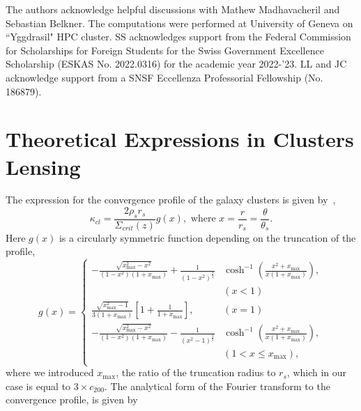 \documentclass[prd, superscriptaddress, tightenlines, longbibliography, nofootinbib, eqsecnum, amsfonts, amsmath, floatfix, twocolumn, notitlepage]{revtex4-2}
\begin{document}
\begin{acknowledgements}
The authors acknowledge helpful discussions with Mathew Madhavacheril and Sebastian Belkner. The computations were performed at University of Geneva on ``Yggdrasil" HPC cluster. SS acknowledges support from the Federal Commission for Scholarships for Foreign Students for the Swiss Government Excellence Scholarship (ESKAS No. 2022.0316) for the academic year 2022-'23. LL and JC acknowledge support from a SNSF Eccellenza Professorial Fellowship (No. 186879).

\end{acknowledgements}

\appendix
\section{Theoretical Expressions in Clusters Lensing}\label{A2}
The expression for the convergence profile of the galaxy clusters is given by~\cite{Takada:2002qq},
\begin{equation}
    \kappa_{cl} = \frac{2\rho_s r_s}{\Sigma_{crit}(z)}g(x), \text{ where } x=\frac{r}{r_s} = \frac{\theta}{\theta_s}.
\end{equation}
Here $g(x)$ is a circularly symmetric function depending on the truncation of the profile,
\begin{equation}
    g(x) = 
     \begin{cases}
       -\frac{\sqrt{x_{\text{max}}^2-x^2}}{(1-x^2)(1+x_{\text{max}})} + \frac{1}{(1-x^2)^{\frac{3}{2}}}&\cosh^{-1}\left(\frac{x^2+x_{\text{max}}}{x(1+x_{\text{max}})}\right),  \\ &(x < 1)\\
       \frac{\sqrt{x_{\text{max}}^2 - 1}}{3(1+x_{\text{max}})}\left[ 1+\frac{1}{1+x_{\text{max}}} \right],  &(x = 1)\\
       -\frac{\sqrt{x_{\text{max}}^2-x^2}}{(1-x^2)(1+x_{\text{max}})} - \frac{1}{(x^2-1)^{\frac{3}{2}}}&\cosh^{-1}\left(\frac{x^2+x_{\text{max}}}{x(1+x_{\text{max}})}\right),  \\
       &(1< x \leq x_{\text{max}}),\\
     \end{cases}
\end{equation}
where we introduced $x_{\text{max}}$, the ratio of the truncation radius to $r_s$, which in our case is equal to $3\times c_{200}$. 
The analytical form of the Fourier transform to the convergence profile, is given by \cite{Scoccimarro:2000gm, 2011PhRvD..83b3008O, Takada:2002qq}%
\end{document}
